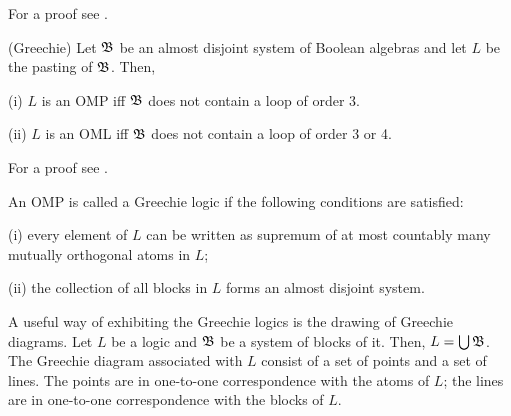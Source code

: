 For a proof see \cite{kalmbach,ptak}.

\begin{theorem}
\label{thgreechie}
(Greechie)
Let ${\frak B}$ be an almost disjoint system of Boolean algebras and let
$L$ be the pasting of ${\frak B}$.
Then,

(i) $L$ is an OMP iff ${\frak B}$ does not contain a loop of order 3.

(ii) $L$ is an OML iff ${\frak B}$ does not contain a loop of
order 3 or 4.
\end{theorem}

For a proof see \cite{kalmbach,ptak}. \\

\begin{defin}
An OMP is called a Greechie logic if the following conditions are satisfied:

(i) every element of $L$ can be written as supremum of at most countably
many mutually orthogonal atoms in $L$;

(ii) the collection of all blocks in $L$ forms an almost disjoint system.
\end{defin}

A useful way of exhibiting the Greechie logics is the drawing of
Greechie diagrams.
Let $L$ be a logic and ${\frak B}$ be a system of blocks of it.
Then, $L = \bigcup {\frak B}$.
The Greechie diagram associated with $L$ consist of a set of
points and a set of lines.
The points are in one-to-one correspondence
with the atoms of $L$; the lines are in one-to-one correspondence
with the blocks of $L$.

